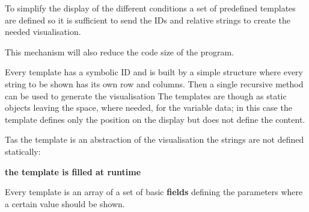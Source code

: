 To simplify the display of the different conditions a set of predefined templates are defined so it is sufficient to send the I\-Ds and relative strings to create the needed visualisation.

This mechanism will also reduce the code size of the program.\par
 Every template has a symbolic I\-D and is built by a simple structure where every string to be shown has its own row and columns. Then a single recursive method can be used to generate the visualisation The templates are though as static objects leaving the space, where needed, for the variable data; in this case the template defines only the position on the display but does not define the content.\par
 Tas the template is an abstraction of the visualisation the strings are not defined statically\-:\par
{\bfseries  the template is filled at runtime}\par
 Every template is an array of a set of basic {\bfseries fields} defining the parameters where a certain value should be shown. 